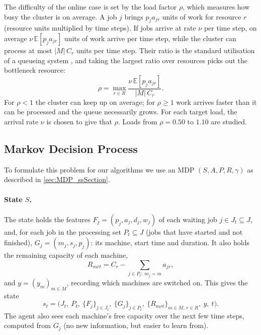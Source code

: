 \documentclass[12pt]{article}
\begin{document}
The difficulty of the online case is set by the load factor $\rho$, which measures how busy the cluster is on average. A job $j$ brings $p_j a_{jr}$ units of work for resource $r$ (resource units multiplied by time steps). If jobs arrive at rate $\nu$ per time step, on average $\nu\,\mathbb{E}[p_j a_{jr}]$ units of work arrive per time step, while the cluster can process at most $|M|\, C_r$ units per time step. Their ratio is the standard utilisation of a queueing system \cite{kleinrock1975queueing}, and taking the largest ratio over resources picks out the bottleneck resource:
\begin{equation}\label{eq:rho}
    \rho = \max_{r \in R} \frac{\nu\, \mathbb{E}[p_j a_{jr}]}{|M|\, C_r}.
\end{equation}
For $\rho < 1$ the cluster can keep up on average; for $\rho \ge 1$ work arrives faster than it can be processed and the queue necessarily grows. For each target load, the arrival rate $\nu$ is chosen to give that $\rho$. Loads from $\rho = 0.50$ to $1.10$ are studied.

\subsection{Markov Decision Process}\label{sec:mdp}
To formulate this problem for our algorithms we use an MDP $(S, A, P, R, \gamma)$ as described in \cref{sec:MDP_ssSection}.

\paragraph{State $S$.} The state holds the features $F_j = (p_j, a_j, d_j, w_j)$ of each waiting job $j \in J_t \subseteq J$, and, for each job in the processing set $P_t \subseteq J$ (jobs that have started and not finished), $G_j = (m_j, s_j, p_j)$: its machine, start time and duration. It also holds the remaining capacity of each machine,
\begin{equation}\label{eq:remaining-capacity}
    R_{mrt} = C_r - \sum_{j \in P_t:\ m_j = m} a_{jr},
\end{equation}
and $y = (y_m)_{m \in M}$, recording which machines are switched on. This gives the state
\begin{equation}\label{eq:state}
    s_t = \big(J_t,\ P_t,\ \{F_j\}_{j \in J_t},\ \{G_j\}_{j \in P_t},\ \{R_{mrt}\}_{m \in M,\, r \in R},\ y,\ t\big).
\end{equation}
The agent also sees each machine's free capacity over the next few time steps, computed from $G_j$ (no new information, but easier to learn from).
\end{document}
